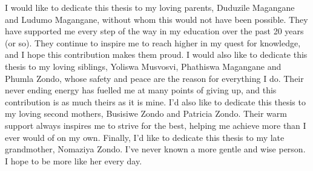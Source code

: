 
\begin{dedication} 

I would like to dedicate this thesis to my loving parents, Duduzile Magangane and Ludumo Magangane, without whom this would not have been possible. They have supported me every step of the way in my education over the past 20 years (or so). They continue to inspire me to reach higher in my quest for knowledge, and I hope this contribution makes them proud. \newline
I would also like to dedicate this thesis to my loving siblings, Yoliswa Musvosvi, Phathiswa Magangane and Phumla Zondo, whose safety and peace are the reason for everything I do. Their never ending energy has fuelled me at many points of giving up, and this contribution is as much theirs as it is mine. I'd also like to dedicate this thesis to my loving second mothers, Busisiwe Zondo and Patricia Zondo. Their warm support always inspires me to strive for the best, helping me achieve more than I ever would of on my own. \newline 
Finally, I'd like to dedicate this thesis to my late grandmother, Nomaziya Zondo. I've never known a more gentle and wise person. I hope to be more like her every day. \newline
 
\end{dedication}